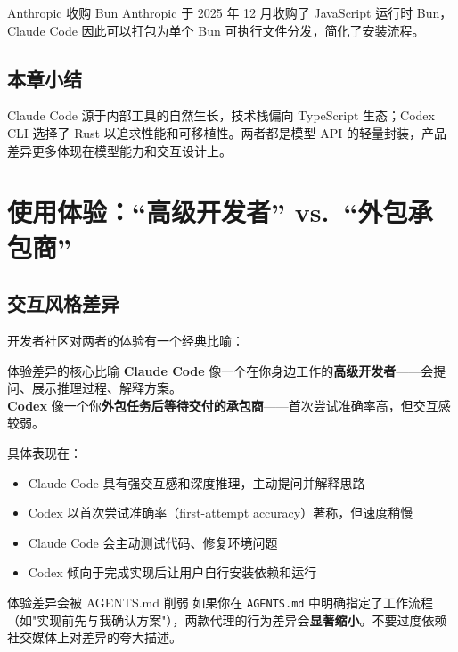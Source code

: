 \documentclass[a4paper]{article}
\begin{document}
\begin{knowledgebox}{Anthropic 收购 Bun}
Anthropic 于 2025 年 12 月收购了 JavaScript 运行时 Bun，Claude Code 因此可以打包为单个 Bun 可执行文件分发，简化了安装流程。
\end{knowledgebox}

\subsection{本章小结}

Claude Code 源于内部工具的自然生长，技术栈偏向 TypeScript 生态；Codex CLI 选择了 Rust 以追求性能和可移植性。两者都是模型 API 的轻量封装，产品差异更多体现在模型能力和交互设计上。

\section{使用体验：``高级开发者'' vs.\ ``外包承包商''}

\subsection{交互风格差异}

开发者社区对两者的体验有一个经典比喻：

\begin{importantbox}{体验差异的核心比喻}
\textbf{Claude Code} 像一个在你身边工作的\textbf{高级开发者}——会提问、展示推理过程、解释方案。\\[0.3em]
\textbf{Codex} 像一个你\textbf{外包任务后等待交付的承包商}——首次尝试准确率高，但交互感较弱。
\end{importantbox}

具体表现在：

\begin{itemize}
    \item Claude Code 具有强交互感和深度推理，主动提问并解释思路
    \item Codex 以首次尝试准确率（first-attempt accuracy）著称，但速度稍慢
    \item Claude Code 会主动测试代码、修复环境问题
    \item Codex 倾向于完成实现后让用户自行安装依赖和运行
\end{itemize}

\begin{warningbox}{体验差异会被 AGENTS.md 削弱}
如果你在 \texttt{AGENTS.md} 中明确指定了工作流程（如"实现前先与我确认方案"），两款代理的行为差异会\textbf{显著缩小}。不要过度依赖社交媒体上对差异的夸大描述。
\end{warningbox}
\end{document}

